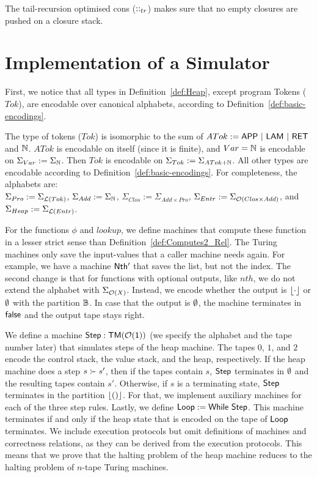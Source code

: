 The tail-recursion optimised cons ($\mathbin{::}_{tr}$) makes sure that no empty closures are\\ pushed on a closure stack.




\section{Implementation of a Simulator}
\label{sec:heap-implementation}

First, we notice that all types in Definition~\ref{def:Heap}, except program Tokens ($Tok$), are encodable over canonical alphabets, according to
Definition~\ref{def:basic-encodings}.
\begin{definition}
  \label{def:Heap-encode}
  The type of tokens ($Tok$) is isomorphic to the sum of $ATok := \mathsf{APP} ~|~ \mathsf{LAM} ~|~ \mathsf{RET}$ and $\mathbb{N}$.  $ATok$ is encodable on itself
  (since it is finite), and $Var = \mathbb{N}$ is encodable on $\Sigma_{Var} := \Sigma_{\mathbb{N}}$.  Then $Tok$ is encodable on
  $\Sigma_{Tok} := \Sigma_{ATok+\mathbb{N}}$.  All other types are encodable according to Definition~\ref{def:basic-encodings}.
  For completeness, the alphabets are:\\
  $\Sigma_{Pro} := \Sigma_{\mathcal{L}(Tok)}$, $\Sigma_{Add} := \Sigma_{\mathbb{N}}$, $\Sigma_{Clos}:=\Sigma_{Add \times Pro}$,
  $\Sigma_{Entr} := \Sigma_{\mathcal{O}(Clos \times Add)}$, and $\Sigma_{Heap} := \Sigma_{\mathcal{L}(Entr)}$.
\end{definition}

For the functions $\phi$ and $lookup$, we define machines that compute these function in a lesser strict sense than
Definition~\ref{def:Computes2_Rel}.  The Turing machines only save the input-values that a caller machine needs again.  For example, we have a machine
$\mathsf{Nth'}$ that saves the list, but not the index.  The second change is that for functions with optional outputs, like $nth$, we do not extend the
alphabet with $\Sigma_{\mathcal{O}(X)}$.  Instead, we encode whether the output is $\left\lfloor {\cdot} \right\rfloor$ or $\emptyset$ with the partition $\mathbb{B}$.  In case that the
output is $\emptyset$, the machine terminates in $\mathsf{false}$ and the output tape stays right.

We define a machine $\mathsf{Step} : \mathsf{TM}(\mathcal{O}(\mathsf{1}))$ (we specify the alphabet and the tape number later) that simulates steps of the heap machine.
The tapes $0$, $1$, and $2$ encode the control stack, the value stack, and the heap, respectively.  If the heap machine does a step $s \succ s'$, then
if the tapes contain $s$, $\mathsf{Step}$ terminates in $\emptyset$ and the resulting tapes contain $s'$.  Otherwise, if $s$ is a terminating state,
$\mathsf{Step}$ terminates in the partition $\left\lfloor {\ensuremath{\mathsf{()}}} \right\rfloor$.  For that, we implement auxiliary machines for each of the three step rules.  Lastly, we define
$\mathsf{Loop} := \mathsf{While}~\mathsf{Step}$.  This machine terminates if and only if the heap state that is encoded on the tape of $\mathsf{Loop}$ terminates.  We
include execution protocols but omit definitions of machines and correctness relations, as they can be derived from the execution protocols.  This
means that we prove that the halting problem of the heap machine reduces to the halting problem of $n$-tape Turing machines.


